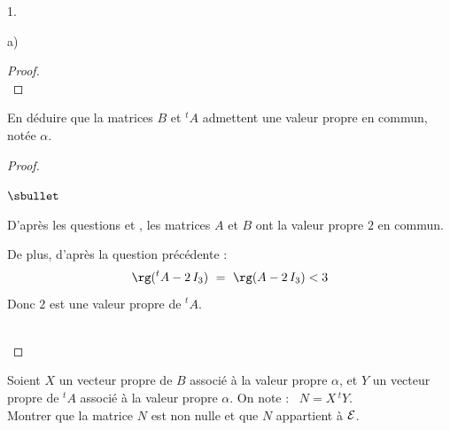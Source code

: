 \documentclass[11pt]{article}%
\begin{document}
\begin{noliste}{1.}
\begin{noliste}{a)}
\begin{proof}
      ~\\[-1.4cm]
    \end{proof}
    
    

    
    \item En déduire que la matrices $B$ et ${}^t A$ admettent une 
    valeur propre en commun, notée $\alpha$.
    
    \begin{proof}~
      \begin{noliste}{$\sbullet$}
        \item D'après les questions  et , les 
	matrices $A$ et $B$ ont la valeur propre $2$ en commun.
        
        \item De plus, d'après la question précédente : 
        \[
          \rg({}^t A - 2 \, I_3) \ = \ \rg(A- 2 \, I_3) < 3
        \]
        Donc $2$ est une valeur propre de ${}^t A$.
      \end{noliste}
      ~\\[-1cm]
    \end{proof}
    
  \item Soient $X$ un vecteur propre de $B$ associé à la valeur propre
    $\alpha$, et $Y$ un vecteur propre de ${}^t A$ associé à la
    valeur propre $\alpha$. On note : \ $N=X \, {}^t Y$.\\
    Montrer que la matrice $N$ est non nulle et que $N$ appartient à
    ${\cal E}$.
    

\end{noliste}
\end{noliste}
\end{document}
